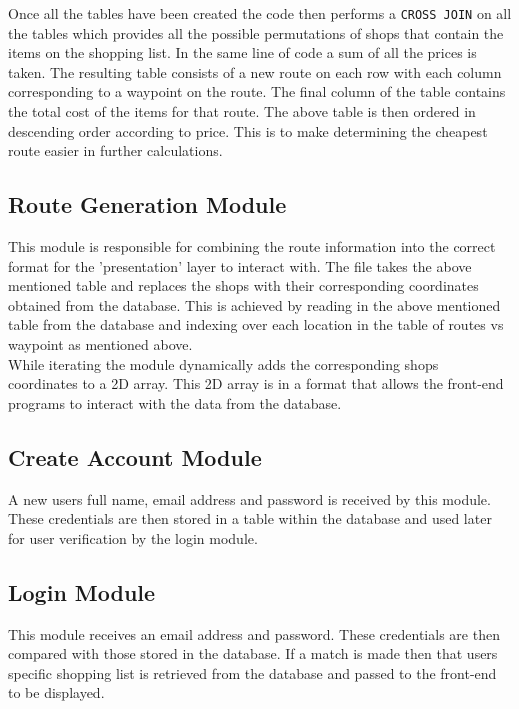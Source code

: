 \documentclass[10pt, a4paper, onecolumn]{scrartcl}
\begin{document}
			Once all the tables have been created the code then performs a \texttt{CROSS JOIN} on all the tables which provides all the possible permutations of shops that contain the items on the shopping list. In the same line of code a sum of all the prices is taken. The resulting table consists of a new route on each row with each column corresponding to a waypoint on the route. The final column of the table contains the total cost of the items for that route. The above table is then ordered in descending order according to price. This is to make determining the cheapest route easier in further calculations.
			
		\subsection{Route Generation Module}
				
			This module is responsible for combining the route information into the correct format for the 'presentation' layer to interact with. The file takes the above mentioned table and replaces the shops with their corresponding coordinates obtained from the database. This is achieved by reading in the above mentioned table from the database and indexing over each location in the table of routes vs waypoint as mentioned above. \\
					
			While iterating the module dynamically adds the corresponding shops coordinates to a 2D array. This 2D array is in a format that allows the front-end programs to interact with the data from the database.
			
		\subsection{Create Account Module}
			
			A new users full name, email address and password is received by this module. These credentials are then stored in a table within the database and used later for user verification by the login module.
			
		\subsection{Login Module}
			 
			This module receives an email address and password. These credentials are then compared with those stored in the database. If a match is made then that users specific shopping list is retrieved from the database and passed to the front-end to be displayed.
\end{document}
